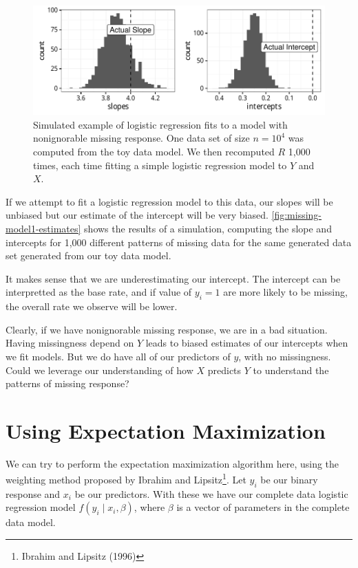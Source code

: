 \documentclass[12pt,twoside]{reedthesis}
\begin{document}
  \begin{figure}[htb]
  \centering
  \includegraphics{figure/missing_model1_estimates.pdf}
  \caption[Simulated example of biased estimates from nonignorable missing data.]{Simulated example of logistic regression fits to a model with nonignorable
  missing response. One data set of size $n = 10^4$ was computed from the toy data model.
  We then recomputed $R$ 1,000 times, each time fitting a simple logistic regression
  model to $Y$ and $X$.}
  \end{figure}
  
  If we attempt to fit a logistic regression model to this data, our
  slopes will be unbiased but our estimate of the intercept will be very
  biased. \autoref{fig:missing-model1-estimates} shows the results of a
  simulation, computing the slope and intercepts for 1,000 different
  patterns of missing data for the same generated data set generated from
  our toy data model.
  
  It makes sense that we are underestimating our intercept. The intercept
  can be interpretted as the base rate, and if value of \(y_i = 1\) are
  more likely to be missing, the overall rate we observe will be lower.
  
  Clearly, if we have nonignorable missing response, we are in a bad
  situation. Having missingness depend on \(Y\) leads to biased estimates
  of our intercepts when we fit models. But we do have all of our
  predictors of \(y\), with no missingness. Could we leverage our
  understanding of how \(X\) predicts \(Y\) to understand the patterns of
  missing response?
  
  \section{Using Expectation Maximization}\label{em-algorithm}
  
  We can try to perform the expectation maximization algorithm here, using
  the weighting method proposed by Ibrahim and Lipsitz\footnote{Ibrahim
    and Lipsitz (1996)}. Let \(y_i\) be our binary response and \(x_i\) be
  our predictors. With these we have our complete data logistic regression
  model \(f(y_i \;|\; x_i, \beta)\), where \(\beta\) is a vector of
  parameters in the complete data model.
  
\end{document}
